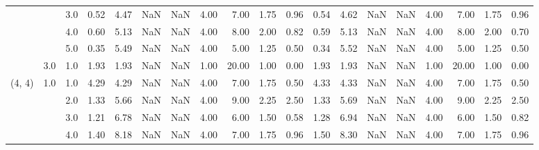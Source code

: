 \begin{tabular}{lllrrrrrrrrrrrrrrrr}
       &     & 3.0  &      0.52 &       4.47 &               NaN &                NaN & 4.00 &   7.00 &             1.75 &                         0.96 &      0.54 &       4.62 &               NaN &                NaN & 4.00 &   7.00 &             1.75 &                         0.96 \\
       &     & 4.0  &      0.60 &       5.13 &               NaN &                NaN & 4.00 &   8.00 &             2.00 &                         0.82 &      0.59 &       5.13 &               NaN &                NaN & 4.00 &   8.00 &             2.00 &                         0.70 \\
       &     & 5.0  &      0.35 &       5.49 &               NaN &                NaN & 4.00 &   5.00 &             1.25 &                         0.50 &      0.34 &       5.52 &               NaN &                NaN & 4.00 &   5.00 &             1.25 &                         0.50 \\
       & 3.0 & 1.0  &      1.93 &       1.93 &               NaN &                NaN & 1.00 &  20.00 &             1.00 &                         0.00 &      1.93 &       1.93 &               NaN &                NaN & 1.00 &  20.00 &             1.00 &                         0.00 \\
(4, 4) & 1.0 & 1.0  &      4.29 &       4.29 &               NaN &                NaN & 4.00 &   7.00 &             1.75 &                         0.50 &      4.33 &       4.33 &               NaN &                NaN & 4.00 &   7.00 &             1.75 &                         0.50 \\
       &     & 2.0  &      1.33 &       5.66 &               NaN &                NaN & 4.00 &   9.00 &             2.25 &                         2.50 &      1.33 &       5.69 &               NaN &                NaN & 4.00 &   9.00 &             2.25 &                         2.50 \\
       &     & 3.0  &      1.21 &       6.78 &               NaN &                NaN & 4.00 &   6.00 &             1.50 &                         0.58 &      1.28 &       6.94 &               NaN &                NaN & 4.00 &   6.00 &             1.50 &                         0.82 \\
       &     & 4.0  &      1.40 &       8.18 &               NaN &                NaN & 4.00 &   7.00 &             1.75 &                         0.96 &      1.50 &       8.30 &               NaN &                NaN & 4.00 &   7.00 &             1.75 &                         0.96 \\

\end{tabular}
